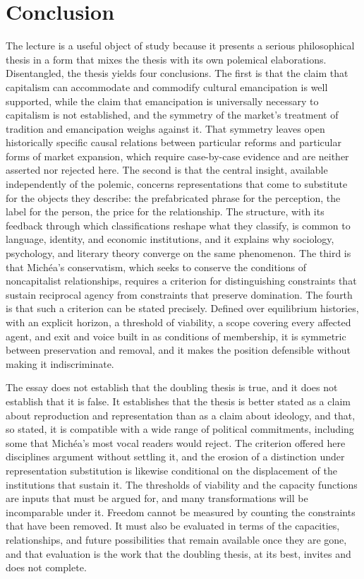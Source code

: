 \documentclass[12pt]{article}
\begin{document}
\section{Conclusion}

The lecture is a useful object of study because it presents a serious philosophical thesis in a form that mixes the thesis with its own polemical elaborations. Disentangled, the thesis yields four conclusions. The first is that the claim that capitalism can accommodate and commodify cultural emancipation is well supported, while the claim that emancipation is universally necessary to capitalism is not established, and the symmetry of the market's treatment of tradition and emancipation weighs against it. That symmetry leaves open historically specific causal relations between particular reforms and particular forms of market expansion, which require case-by-case evidence and are neither asserted nor rejected here. The second is that the central insight, available independently of the polemic, concerns representations that come to substitute for the objects they describe: the prefabricated phrase for the perception, the label for the person, the price for the relationship. The structure, with its feedback through which classifications reshape what they classify, is common to language, identity, and economic institutions, and it explains why sociology, psychology, and literary theory converge on the same phenomenon. The third is that Michéa's conservatism, which seeks to conserve the conditions of noncapitalist relationships, requires a criterion for distinguishing constraints that sustain reciprocal agency from constraints that preserve domination. The fourth is that such a criterion can be stated precisely. Defined over equilibrium histories, with an explicit horizon, a threshold of viability, a scope covering every affected agent, and exit and voice built in as conditions of membership, it is symmetric between preservation and removal, and it makes the position defensible without making it indiscriminate.

The essay does not establish that the doubling thesis is true, and it does not establish that it is false. It establishes that the thesis is better stated as a claim about reproduction and representation than as a claim about ideology, and that, so stated, it is compatible with a wide range of political commitments, including some that Michéa's most vocal readers would reject. The criterion offered here disciplines argument without settling it, and the erosion of a distinction under representation substitution is likewise conditional on the displacement of the institutions that sustain it. The thresholds of viability and the capacity functions are inputs that must be argued for, and many transformations will be incomparable under it. Freedom cannot be measured by counting the constraints that have been removed. It must also be evaluated in terms of the capacities, relationships, and future possibilities that remain available once they are gone, and that evaluation is the work that the doubling thesis, at its best, invites and does not complete.
\end{document}

